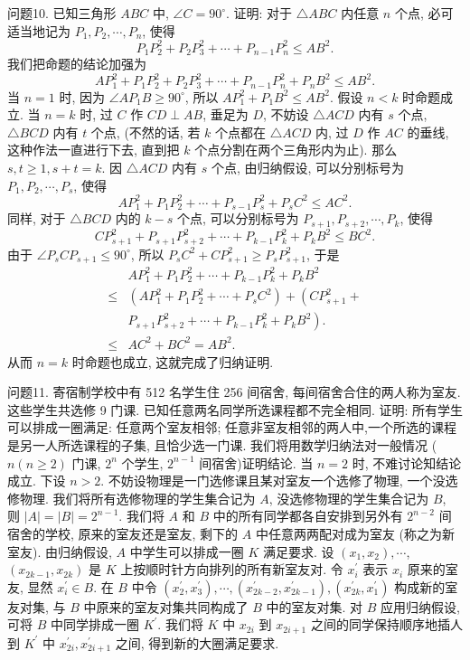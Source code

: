 问题10. 已知三角形 $A B C$ 中, $\angle C=90^{\circ}$. 证明: 对于 $\triangle A B C$ 内任意 $n$ 个点, 必可适当地记为 $P_1, P_2, \cdots, P_n$, 使得
$$
P_1 P_2^2+P_2 P_3^2+\cdots+P_{n-1} P_n^2 \leqslant A B^2 .
$$
我们把命题的结论加强为
$$
A P_1^2+P_1 P_2^2+P_2 P_3^2+\cdots+P_{n-1} P_n^2+P_n B^2 \leqslant A B^2 .
$$
当 $n=1$ 时, 因为 $\angle A P_1 B \geqslant 90^{\circ}$, 所以 $A P_1^2+P_1 B^2 \leqslant A B^2$.
假设 $n<k$ 时命题成立.
当 $n=k$ 时, 过 $C$ 作 $C D \perp A B$, 垂足为 $D$, 不妨设 $\triangle A C D$ 内有 $s$ 个点, $\triangle B C D$ 内有 $t$ 个点, (不然的话, 若 $k$ 个点都在 $\triangle A C D$ 内, 过 $D$ 作 $A C$ 的垂线, 这种作法一直进行下去, 直到把 $k$ 个点分割在两个三角形内为止). 那么 $s, t \geqslant 1, s+t=k$.
因 $\triangle A C D$ 内有 $s$ 个点, 由归纳假设, 可以分别标号为 $P_1, P_2, \cdots, P_s$, 使得
$$
A P_1^2+P_1 P_2^2+\cdots+P_{s-1} P_s^2+P_s C^2 \leqslant A C^2 .
$$
同样, 对于 $\triangle B C D$ 内的 $k-s$ 个点, 可以分别标号为 $P_{s+1}, P_{s+2}, \cdots, P_k$, 使得
$$
C P_{s+1}^2+P_{s+1} P_{s+2}^2+\cdots+P_{k-1} P_k^2+P_k B^2 \leqslant B C^2 .
$$
由于 $\angle P_s C P_{s+1} \leqslant 90^{\circ}$, 所以 $P_s C^2+C P_{s+1}^2 \geqslant P_s P_{s+1}^2$, 于是
$$
\begin{aligned}
& A P_1^2+P_1 P_2^2+\cdots+P_{k-1} P_k^2+P_k B^2 \\
\leqslant & \left(A P_1^2+P_1 P_2^2+\cdots+P_s C^2\right)+\left(C P_{s+1}^2+\right. \\
& \left.P_{s+1} P_{s+2}^2+\cdots+P_{k-1} P_k^2+P_k B^2\right) . \\
\leqslant & A C^2+B C^2=A B^2 .
\end{aligned}
$$
从而 $n=k$ 时命题也成立, 这就完成了归纳证明.



问题11. 寄宿制学校中有 512 名学生住 256 间宿舍, 每间宿舍合住的两人称为室友.
这些学生共选修 9 门课.
已知任意两名同学所选课程都不完全相同.
证明: 所有学生可以排成一圈满足: 任意两个室友相邻; 任意非室友相邻的两人中,一个所选的课程是另一人所选课程的子集, 且恰少选一门课.
我们将用数学归纳法对一般情况 ($n(n \geqslant 2)$ 门课, $2^n$ 个学生, $2^{n-1}$ 间宿舍)证明结论.
当 $n=2$ 时, 不难讨论知结论成立.
下设 $n>2$.
不妨设物理是一门选修课且某对室友一个选修了物理, 一个没选修物理.
我们将所有选修物理的学生集合记为 $A$, 没选修物理的学生集合记为 $B$, 则 $|A|=|B|=2^{n-1}$. 我们将 $A$ 和 $B$ 中的所有同学都各自安排到另外有 $2^{n-2}$ 间宿舍的学校, 原来的室友还是室友, 剩下的 $A$ 中任意两两配对成为室友 (称之为新室友). 由归纳假设, $A$ 中学生可以排成一圈 $K$ 满足要求.
设 $\left(x_1, x_2\right), \cdots$, $\left(x_{2 k-1}, x_{2 k}\right)$ 是 $K$ 上按顺时针方向排列的所有新室友对.
令 $x_i^{\prime}$ 表示 $x_i$ 原来的室友, 显然 $x_i^{\prime} \in B$. 在 $B$ 中令 $\left(x_2^{\prime}, x_3^{\prime}\right), \cdots,\left(x_{2 k-2}^{\prime}, x_{2 k-1}^{\prime}\right),\left(x_{2 k}^{\prime}, x_1^{\prime}\right)$ 构成新的室友对集, 与 $B$ 中原来的室友对集共同构成了 $B$ 中的室友对集.
对 $B$ 应用归纳假设, 可将 $B$ 中同学排成一圈 $K^{\prime}$. 我们将 $K$ 中 $x_{2 i}$ 到 $x_{2 i+1}$ 之间的同学保持顺序地插人到 $K^{\prime}$ 中 $x_{2 i}^{\prime}, x_{2 i+1}^{\prime}$ 之间, 得到新的大圈满足要求.


